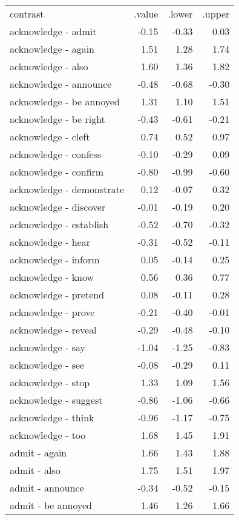 \begin{longtable}{lrrr}
 contrast & .value & .lower & .upper \\ 
 acknowledge - admit & -0.15 & -0.33 & 0.03 \\ 
  acknowledge - again & 1.51 & 1.28 & 1.74 \\ 
  acknowledge - also & 1.60 & 1.36 & 1.82 \\ 
  acknowledge - announce & -0.48 & -0.68 & -0.30 \\ 
  acknowledge - be annoyed & 1.31 & 1.10 & 1.51 \\ 
  acknowledge - be right & -0.43 & -0.61 & -0.21 \\ 
  acknowledge - cleft & 0.74 & 0.52 & 0.97 \\ 
  acknowledge - confess & -0.10 & -0.29 & 0.09 \\ 
  acknowledge - confirm & -0.80 & -0.99 & -0.60 \\ 
  acknowledge - demonstrate & 0.12 & -0.07 & 0.32 \\ 
  acknowledge - discover & -0.01 & -0.19 & 0.20 \\ 
  acknowledge - establish & -0.52 & -0.70 & -0.32 \\ 
  acknowledge - hear & -0.31 & -0.52 & -0.11 \\ 
  acknowledge - inform & 0.05 & -0.14 & 0.25 \\ 
  acknowledge - know & 0.56 & 0.36 & 0.77 \\ 
  acknowledge - pretend & 0.08 & -0.11 & 0.28 \\ 
  acknowledge - prove & -0.21 & -0.40 & -0.01 \\ 
  acknowledge - reveal & -0.29 & -0.48 & -0.10 \\ 
  acknowledge - say & -1.04 & -1.25 & -0.83 \\ 
  acknowledge - see & -0.08 & -0.29 & 0.11 \\ 
  acknowledge - stop & 1.33 & 1.09 & 1.56 \\ 
  acknowledge - suggest & -0.86 & -1.06 & -0.66 \\ 
  acknowledge - think & -0.96 & -1.17 & -0.75 \\ 
  acknowledge - too & 1.68 & 1.45 & 1.91 \\ 
  admit - again & 1.66 & 1.43 & 1.88 \\ 
  admit - also & 1.75 & 1.51 & 1.97 \\ 
  admit - announce & -0.34 & -0.52 & -0.15 \\ 
  admit - be annoyed & 1.46 & 1.26 & 1.66 \\ 

\end{longtable}
